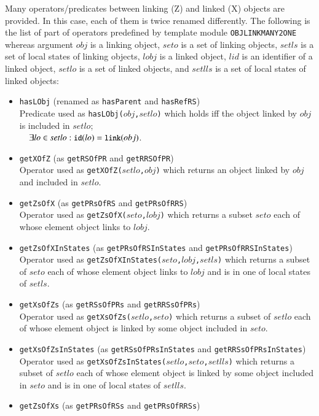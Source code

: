 \documentclass[12pt]{report}
\newcommand{\mbstt}[1]{\mbox{\small{\tt {#1}}}}
\newcommand{\stt}[1]{{\small{\tt {#1}}}}
\begin{document}
Many operators/predicates between linking (Z) and linked (X) objects
are provided. In this case, each of them is twice renamed differently.
The following is the list of part of operators predefined by template
module {\tt OBJLINKMANY2ONE} whereas argument $obj$ is a linking
object, $seto$ is a set of linking objects, $setls$ is a set of local
states of linking objects, $lobj$ is a linked object, $lid$ is an
identifier of a linked object, $setlo$ is a set of linked objects, and
$setlls$ is a set of local states of linked objects:
\begin{itemize}
\item \stt{hasLObj} (renamed as \stt{hasParent} and \stt{hasRefRS})\\
  Predicate used as \stt{hasLObj($obj$,$setlo$)} which holds iff
  the object linked by $obj$ is included in $setlo$;\\$~~~~\exists lo\in
  setlo:\mbstt{id}(lo)=\mbstt{link}(obj)$.
\item \stt{getXOfZ} (as \stt{getRSOfPR} and \stt{getRRSOfPR})\\
  Operator used as \stt{getXOfZ($setlo$,$obj$)} which returns an
  object linked by $obj$ and included in $setlo$.
\item \stt{getZsOfX} (as \stt{getPRsOfRS} and \stt{getPRsOfRRS})\\
  Operator used as \stt{getZsOfX($seto$,$lobj$)} which returns a subset
  $seto$ each of whose element object links to $lobj$.
\item \stt{getZsOfXInStates} (as \stt{getPRsOfRSInStates} and \stt{getPRsOfRRSInStates})\\
  Operator used as \stt{getZsOfXInStates($seto$,$lobj$,$setls$)} which
  returns a subset of $seto$ each of whose element object links to
  $lobj$ and is in one of local states of $setls$.
\item \stt{getXsOfZs} (as \stt{getRSsOfPRs} and \stt{getRRSsOfPRs})\\
  Operator used as \stt{getXsOfZs($setlo$,$seto$)} which returns a
  subset of $setlo$ each of whose element object is linked by some
  object included in $seto$.
\item \stt{getXsOfZsInStates} (as \stt{getRSsOfPRsInStates} and \stt{getRRSsOfPRsInStates})\\
  Operator used as \stt{getXsOfZsInStates($setlo$,$seto$,$setlls$)}
  which returns a subset of $setlo$ each of whose element object is
  linked by some object included in $seto$ and is in one of local
  states of $setlls$.
\item \stt{getZsOfXs} (as \stt{getPRsOfRSs} and \stt{getPRsOfRRSs})\\

\end{itemize}
\end{document}
